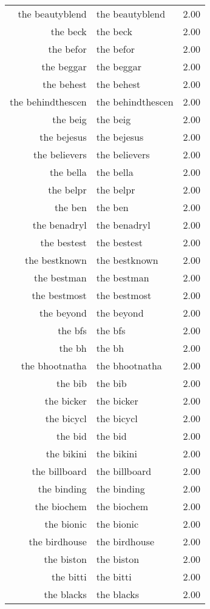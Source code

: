 \begin{table}[ht]
\begin{tabular}{rlr}
  the beautyblend & the beautyblend & 2.00 \\ 
  the beck & the beck & 2.00 \\ 
  the befor & the befor & 2.00 \\ 
  the beggar & the beggar & 2.00 \\ 
  the behest & the behest & 2.00 \\ 
  the behindthescen & the behindthescen & 2.00 \\ 
  the beig & the beig & 2.00 \\ 
  the bejesus & the bejesus & 2.00 \\ 
  the believers & the believers & 2.00 \\ 
  the bella & the bella & 2.00 \\ 
  the belpr & the belpr & 2.00 \\ 
  the ben & the ben & 2.00 \\ 
  the benadryl & the benadryl & 2.00 \\ 
  the bestest & the bestest & 2.00 \\ 
  the bestknown & the bestknown & 2.00 \\ 
  the bestman & the bestman & 2.00 \\ 
  the bestmost & the bestmost & 2.00 \\ 
  the beyond & the beyond & 2.00 \\ 
  the bfs & the bfs & 2.00 \\ 
  the bh & the bh & 2.00 \\ 
  the bhootnatha & the bhootnatha & 2.00 \\ 
  the bib & the bib & 2.00 \\ 
  the bicker & the bicker & 2.00 \\ 
  the bicycl & the bicycl & 2.00 \\ 
  the bid & the bid & 2.00 \\ 
  the bikini & the bikini & 2.00 \\ 
  the billboard & the billboard & 2.00 \\ 
  the binding & the binding & 2.00 \\ 
  the biochem & the biochem & 2.00 \\ 
  the bionic & the bionic & 2.00 \\ 
  the birdhouse & the birdhouse & 2.00 \\ 
  the biston & the biston & 2.00 \\ 
  the bitti & the bitti & 2.00 \\ 
  the blacks & the blacks & 2.00 \\ 

\end{tabular}
\end{table}
